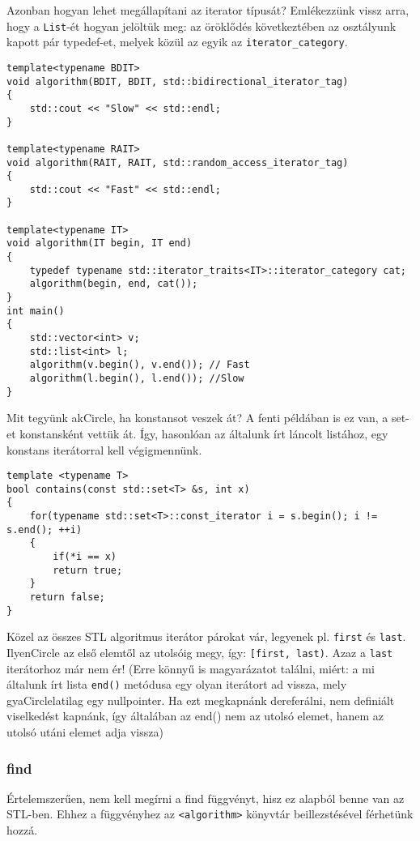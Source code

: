\documentclass[a4paper,11.5pt]{article}
\begin{document}
	\medskip
	Azonban hogyan lehet megállapítani az iterator típusát? Emlékezzünk vissz arra, hogy a \texttt{List}-ét hogyan jelöltük meg: az öröklődés következtében az osztályunk kapott pár typedef-et, melyek közül az egyik az \texttt{iterator\_category}.
	\begin{lstlisting}
template<typename BDIT> 
void algorithm(BDIT, BDIT, std::bidirectional_iterator_tag) 
{
	std::cout << "Slow" << std::endl;
}

template<typename RAIT>
void algorithm(RAIT, RAIT, std::random_access_iterator_tag) 
{
	std::cout << "Fast" << std::endl;
}

template<typename IT> 
void algorithm(IT begin, IT end) 
{
	typedef typename std::iterator_traits<IT>::iterator_category cat;
	algorithm(begin, end, cat());
}
int main() 
{
	std::vector<int> v;
	std::list<int> l;
	algorithm(v.begin(), v.end()); // Fast
	algorithm(l.begin(), l.end()); //Slow
}  
	\end{lstlisting}
	Mit tegyünk akCircle, ha konstansot veszek át? A fenti példában is ez van, a set-et konstansként vettük át. Így, hasonlóan az általunk írt láncolt listához, egy konstans iterátorral kell végigmennünk.
\begin{lstlisting}
template <typename T>
bool contains(const std::set<T> &s, int x)
{
	for(typename std::set<T>::const_iterator i = s.begin(); i != s.end(); ++i)
	{
		if(*i == x)
		return true;
	}
	return false;
}
\end{lstlisting}
	
	\medskip
	Közel az összes STL algoritmus iterátor párokat vár, legyenek pl. \texttt{first} és \texttt{last}. IlyenCircle az első elemtől az utolsóig megy, így: \texttt{[first, last)}. Azaz a \texttt{last} iterátorhoz már nem ér! (Erre könnyű is magyarázatot találni, miért: a mi általunk írt lista \texttt{end()} metódusa egy olyan iterátort ad vissza, mely gyaCirclelatilag egy nullpointer. Ha ezt megkapnánk dereferálni, nem definiált viselkedést kapnánk, így általában az end() nem az utolsó elemet, hanem az utolsó utáni elemet adja vissza)
	
	\subsubsection{find}
	Értelemszerűen, nem kell megírni a find függvényt, hisz ez alapból benne van az STL-ben. Ehhez a függvényhez az \texttt{<algorithm>} könyvtár beillezstésével férhetünk hozzá. 
	
\end{document}
